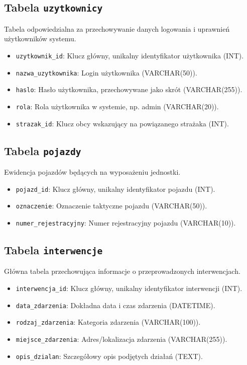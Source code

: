 \subsection{Tabela \texttt{uzytkownicy}}
Tabela odpowiedzialna za przechowywanie danych logowania i uprawnień użytkowników systemu.
\begin{itemize}
    \item \texttt{uzytkownik\_id}: Klucz główny, unikalny identyfikator użytkownika (INT).
    \item \texttt{nazwa\_uzytkownika}: Login użytkownika (VARCHAR(50)).
    \item \texttt{haslo}: Hasło użytkownika, przechowywane jako skrót (VARCHAR(255)).
    \item \texttt{rola}: Rola użytkownika w systemie, np. admin (VARCHAR(20)).
    \item \texttt{strazak\_id}: Klucz obcy wskazujący na powiązanego strażaka (INT).
\end{itemize}

\subsection{Tabela \texttt{pojazdy}}
Ewidencja pojazdów będących na wyposażeniu jednostki.
\begin{itemize}
    \item \texttt{pojazd\_id}: Klucz główny, unikalny identyfikator pojazdu (INT).
    \item \texttt{oznaczenie}: Oznaczenie taktyczne pojazdu (VARCHAR(50)).
    \item \texttt{numer\_rejestracyjny}: Numer rejestracyjny pojazdu (VARCHAR(10)).
\end{itemize}

\subsection{Tabela \texttt{interwencje}}
Główna tabela przechowująca informacje o przeprowadzonych interwencjach.
\begin{itemize}
    \item \texttt{interwencja\_id}: Klucz główny, unikalny identyfikator interwencji (INT).
    \item \texttt{data\_zdarzenia}: Dokładna data i czas zdarzenia (DATETIME).
    \item \texttt{rodzaj\_zdarzenia}: Kategoria zdarzenia (VARCHAR(100)).
    \item \texttt{miejsce\_zdarzenia}: Adres/lokalizacja zdarzenia (VARCHAR(255)).
    \item \texttt{opis\_dzialan}: Szczegółowy opis podjętych działań (TEXT).
\end{itemize}

